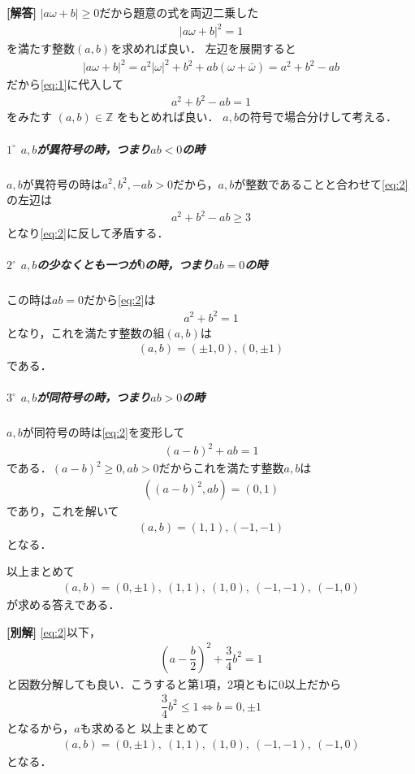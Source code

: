 \documentclass[../../main.tex]{subfiles}
\begin{document}
\begin{oframed}
  
\end{oframed}

{\bf [解答]}
$|a\omega+b|\ge 0$だから題意の式を両辺二乗した
\begin{align}
  |a\omega+b|^2 = 1 \label{eq:1}
\end{align}
を満たす整数$(a,b)$を求めれば良い．
左辺を展開すると
\begin{align}
  |a\omega+b|^2 = a^2|\omega|^2+b^2+ab(\omega+\bar\omega) = a^2+b^2-ab
\end{align}
だから\cref{eq:1}に代入して
\begin{align}
  a^2+b^2-ab=1 \label{eq:2}
\end{align}
をみたす $(a,b)\in\mathbb{Z}$ をもとめれば良い．
$a,b$の符号で場合分けして考える．

\subparagraph{$1^{\circ}$ $a,b$が異符号の時，つまり$ab < 0$の時}

$a,b$が異符号の時は$a^2,b^2,-ab > 0$だから，$a,b$が整数であることと合わせて\cref{eq:2}の左辺は
\begin{align}
  a^2 + b^2 - ab \ge 3
\end{align}
となり\cref{eq:2}に反して矛盾する．

\subparagraph{$2^{\circ}$ $a,b$の少なくとも一つが$0$の時，つまり$ab = 0$の時}

この時は$ab=0$だから\cref{eq:2}は
\begin{align}
  a^2 + b^2 = 1
\end{align}
となり，これを満たす整数の組$(a,b)$は
\begin{align}
  (a,b) = (\pm 1,0), (0, \pm 1)
\end{align}
である．

\subparagraph{$3^{\circ}$ $a,b$が同符号の時，つまり$ab > 0$の時}

$a,b$が同符号の時は\cref{eq:2}を変形して
\begin{align}
  (a-b)^2 + ab = 1
\end{align}
である．$(a-b)^2 \ge 0, ab >0$だからこれを満たす整数$a,b$は
\begin{align}
  ((a-b)^2,ab) = (0,1)
\end{align}
であり，これを解いて
\begin{align}
  (a,b) = (1,1), (-1, -1)
\end{align}
となる．
\casesend

以上まとめて
\begin{align}
  (a,b)=(0,\pm1),\ (1,1),\ (1,0),\ (-1,-1),\ (-1,0)
\end{align}
が求める答えである．

{\bf [別解]}
\cref{eq:2}以下，
\begin{align}
  \left(a-\dfrac{b}{2}\right)^2 + \dfrac{3}{4}b^2 = 1
\end{align}
と因数分解しても良い．こうすると第1項，2項ともに$0$以上だから
\begin{align}
  \dfrac{3}{4}b^2 \le 1
  \iff
  b = 0,\pm 1
\end{align}
となるから，$a$も求めると
以上まとめて
\begin{align}
  (a,b)=(0,\pm1),\ (1,1),\ (1,0),\ (-1,-1),\ (-1,0)
\end{align}
となる．

\newpage
\end{document}
